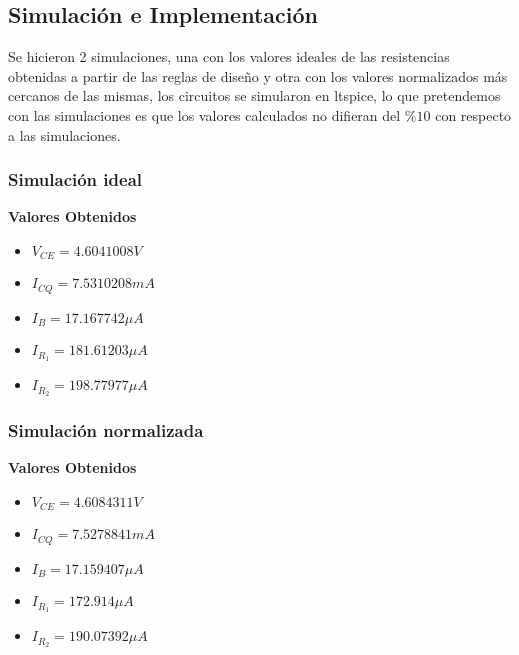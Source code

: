 \begin{multicols}{2}
		\subsection{Simulación e Implementación}
			\sangria{}Se hicieron 2 simulaciones, una con los valores ideales de las resistencias obtenidas a partir de las reglas de diseño y otra con los valores normalizados más cercanos de las mismas, los circuitos se simularon en ltspice, lo que pretendemos con las simulaciones es que los valores calculados no difieran del $\%10$ con respecto a las simulaciones.

			\subsubsection{Simulación ideal}

				\textbf{Valores Obtenidos}
				\begin{itemize}
					\item $V_{CE} = 4.6041008 V$\\
					\item $I_{CQ}= 7.5310208 mA$\\
					\item $I_B = 17.167742\mu A$\\
					\item $I_{R_1} = 181.61203\mu A$\\
					\item $I_{R_2} = 198.77977\mu A$\\
				\end{itemize}

			\subsubsection{Simulación normalizada}

				\textbf{Valores Obtenidos}
				\begin{itemize}
					\item $V_{CE} = 4.6084311 V$\\
					\item $I_{CQ}= 7.5278841 mA$\\
					\item $I_B = 17.159407\mu A$\\
					\item $I_{R_1} = 172.914\mu A$\\
					\item $I_{R_2} = 190.07392\mu A$\\
				\end{itemize}




\end{multicols}
